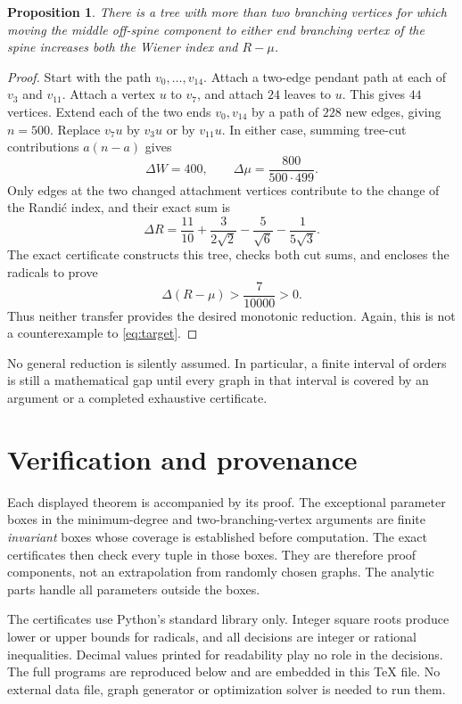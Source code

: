 \documentclass[11pt,a4paper]{article}
\newtheorem{proposition}[theorem]{Proposition}
\theoremstyle{remark}\newtheorem{remark}[theorem]{Remark}
\begin{document}
\begin{proposition}\label{prop:branch-obstruction}
There is a tree with more than two branching vertices for which moving
the middle off-spine component to either end branching vertex of the
spine increases both the Wiener index and $R-\mu$.
\end{proposition}
\begin{proof}
Start with the path $v_0,\ldots,v_{14}$. Attach a two-edge pendant path
at each of $v_3$ and $v_{11}$. Attach a vertex $u$ to $v_7$, and attach
$24$ leaves to $u$. This gives $44$ vertices. Extend each of the two
ends $v_0,v_{14}$ by a path of $228$ new edges, giving $n=500$.
Replace $v_7u$ by $v_3u$ or by $v_{11}u$.
In either case, summing tree-cut contributions $a(n-a)$ gives
\[
 \Delta W=400,\qquad
 \Delta\mu=\frac{800}{500\cdot499}.
\]
Only edges at the two changed attachment vertices contribute to
the change of the Randi\'c index, and their exact sum is
\[
 \Delta R=
 \frac{11}{10}+\frac3{2\sqrt2}
 -\frac5{\sqrt6}-\frac1{5\sqrt3}.
\]
The exact certificate constructs this tree, checks both cut sums, and
encloses the radicals to prove
\[
 \Delta(R-\mu)>\frac7{10000}>0.
\]
Thus neither transfer provides the desired monotonic reduction.
Again, this is not a counterexample to \eqref{eq:target}.
\end{proof}

No general reduction is silently assumed. In particular, a finite interval of
orders is still a mathematical gap until every graph in that interval
is covered by an argument or a completed exhaustive certificate.

\section{Verification and provenance}
\label{sec:verification}

Each displayed theorem is accompanied by its proof. The exceptional
parameter boxes in the minimum-degree and two-branching-vertex arguments
are finite \emph{invariant} boxes whose coverage is established before
computation. The exact certificates then check every tuple in those boxes.
They are therefore proof components, not an extrapolation from randomly
chosen graphs. The analytic parts handle all parameters outside the boxes.

The certificates use Python's standard library only. Integer square roots
produce lower or upper bounds for radicals, and all decisions are integer
or rational inequalities. Decimal values printed for readability play no
role in the decisions. The full programs are reproduced below and are
embedded in this TeX file. No external data file, graph generator or
optimization solver is needed to run them.
\end{document}
